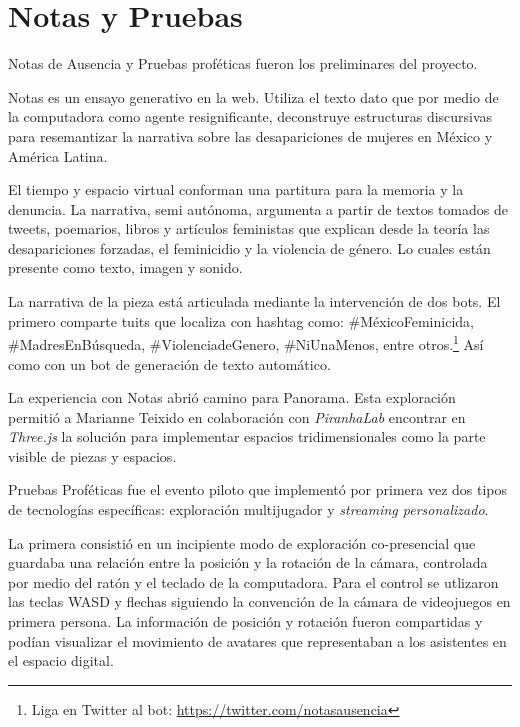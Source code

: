 
\section*{Notas y Pruebas} %


Notas de Ausencia y Pruebas proféticas fueron los preliminares del proyecto. 


Notas es un ensayo generativo en la web. Utiliza el texto dato que por medio de la computadora como agente resignificante, deconstruye estructuras discursivas para resemantizar la narrativa sobre las desapariciones de mujeres en México y América Latina.

El tiempo y espacio virtual conforman una partitura para la memoria y la denuncia. La narrativa, semi autónoma, argumenta a partir de textos tomados de tweets, poemarios, libros y artículos feministas que explican desde la teoría las desapariciones forzadas, el feminicidio y la violencia de género. Lo cuales están presente como texto, imagen y sonido.

La narrativa de la pieza está articulada mediante la intervención de dos bots. El primero comparte tuits que localiza con hashtag como: \#MéxicoFeminicida, \#MadresEnBúsqueda, \#ViolenciadeGenero, \#NiUnaMenos, entre otros.\footnote{Liga en Twitter al bot: \url{https://twitter.com/notasausencia}} Así como con un bot de generación de texto automático.

La experiencia con Notas abrió camino para Panorama. Esta exploración permitió a Marianne Teixido en colaboración con \textit{PiranhaLab} encontrar en \textit{Three.js} la solución para implementar espacios tridimensionales como la parte visible de piezas y espacios.  

Pruebas Proféticas fue el evento piloto que implementó por primera vez dos tipos de tecnologías específicas: exploración multijugador y \textit{streaming personalizado}.

La primera consistió en un incipiente modo de exploración co-presencial que guardaba una relación entre la posición y la rotación de la cámara, controlada por medio del ratón y el teclado de la computadora. Para el control se utlizaron las teclas WASD y flechas siguiendo la convención de la cámara de videojuegos en primera persona. La información de posición y rotación fueron compartidas y podían visualizar el movimiento de avatares que representaban a los asistentes en el espacio digital. 

